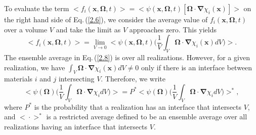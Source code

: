 \documentclass[12pt]{article}
\newcommand{\bl}{\big<}
\newcommand{\bg}{\big>}
\begin{document}
To evaluate the term $\bl f_i(\bm x,\bm\Omega,t)\bg = \bl\psi(\bm x,\bm\Omega,t)[\bm\Omega\cdot\bm\nabla\chi_i(\bm x)]\bg$ on the right hand side of Eq.$\,$(\ref{2.6}), we consider the average value of $f_i(\bm x,\bm\Omega,t)$ over a volume $V$ and take the limit as $V$ approaches zero.
This yields
\begin{equation}\label{2.8}
\bl f_i(\bm x,\bm\Omega,t)\bg= 
\lim_{V \rightarrow 0} \bigg<\psi(\bm x,\bm\Omega,t)\bigg(\frac{1}{V}
\int_{V}\bm\Omega\cdot\bm\nabla\chi_i(\bm x)dV\bigg)\bigg>.
\end{equation}
 The ensemble average in Eq.$\,$(\ref{2.8}) is over all realizations.
 However, for a given realization, we have $\int_{V}\bm\Omega\cdot\bm\nabla\chi_i(\bm x)dV\not = 0$ only if there is an interface between materials $i$ and $j$ intersecting $V$.
 Therefore, we write
\begin{equation}
\bigg<\psi(\bm\Omega)\bigg(\frac{1}{V}
\int_{V}\bm\Omega\cdot\bm\nabla\chi_idV\bigg)\bigg> = 
P^* \bigg<\psi(\bm\Omega)\bigg(\frac{1}{V}
\int_{V}\bm\Omega\cdot\bm\nabla\chi_idV\bigg)\bigg>^*,
\end{equation}
 where $P^*$ is the probability that a realization has an interface that intersects $V$, and $\bl \cdot \bg^*$ is a restricted average defined to be an ensemble average over all realizations having an interface that intersects $V$.
\end{document}
